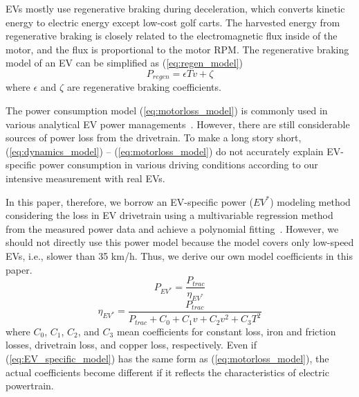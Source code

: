 \documentclass{IEEEtran}
\begin{document}
EVs mostly use regenerative braking during deceleration, which converts kinetic energy to electric energy except low-cost golf carts. The harvested energy from regenerative braking is closely related to the electromagnetic flux inside of the motor, and the flux is proportional to the motor RPM. The regenerative braking model of an EV can be  simplified as (\ref{eq:regen_model}) 
%
\begin{equation}\label{eq:regen_model} 
P_{regen} = \epsilon T v + \zeta
\end{equation}  %
%
where $\epsilon$ and $\zeta$ are regenerative braking coefficients.

The power consumption model (\ref{eq:motorloss_model}) is commonly used in various analytical EV power managements~\cite{Dib:IVPPC11, Dib:CEP14, Wu:TR15}. However, there are still considerable sources of power loss from  the drivetrain. To make a long story short, (\ref{eq:dynamics_model}) -- (\ref{eq:motorloss_model}) do not accurately explain EV-specific power consumption in various driving conditions according to our intensive measurement with real EVs. 

In this paper, therefore, we borrow an EV-specific power ($EV^*$) modeling method considering the loss in EV drivetrain using a multivariable regression method from the measured power data and achieve a polynomial fitting~\cite{Hong:ASPDAC16}. However, we should not directly use this power model because the model covers only low-speed EVs, i.e., slower than 35 km/h. Thus, we derive our own model coefficients in this paper.
%
\begin{equation} \label{eq:EV_specific_model} %
P_{EV^*} = \frac{P_{trac}}{\eta_{EV^*}}
\end{equation} 
\begin{equation}
\eta_{EV^*} = \frac{P_{trac}}{{P_{trac} + C_0 + C_1 v + C_2 v^2 + C_3 T^2}}\nonumber
\end{equation}	
where $C_0$, $C_1$, $C_2$, and $C_3$ mean coefficients for constant loss, iron and friction losses, drivetrain loss, and copper loss, respectively. Even if (\ref{eq:EV_specific_model}) has the same form as (\ref{eq:motorloss_model}), the actual coefficients become different if it reflects the characteristics of electric powertrain. 
\end{document}
